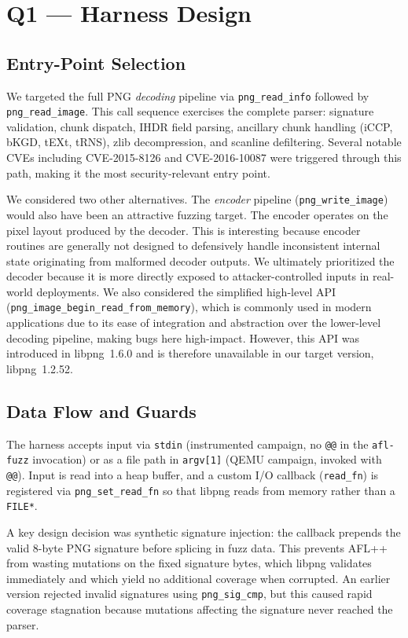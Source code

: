 \documentclass[letterpaper,twocolumn,10pt]{article}
\begin{document}
\section{Q1 --- Harness Design}
\label{sec:q1}

\subsection{Entry-Point Selection}

We targeted the full PNG \emph{decoding} pipeline via
\texttt{png\_read\_info} followed by \texttt{png\_read\_image}.
This call sequence exercises the complete parser: signature
validation, chunk dispatch, IHDR field parsing, ancillary chunk
handling (iCCP, bKGD, tEXt, tRNS), zlib decompression, and scanline
defiltering. Several notable CVEs including CVE-2015-8126 and
CVE-2016-10087 were triggered through this path, making it the most
security-relevant entry point.


We considered two other alternatives. The \emph{encoder} pipeline (\texttt{png\_write\_image}) would also have been an attractive fuzzing target. The encoder operates on the pixel layout produced by the decoder. This is interesting because encoder routines are generally not designed to defensively handle inconsistent internal state originating from malformed decoder outputs. We ultimately prioritized the decoder because it is more directly exposed to attacker-controlled inputs in real-world deployments. We also considered the simplified high-level API (\texttt{png\_image\_begin\_read\_from\_memory}), which is commonly used in modern applications due to its ease of integration and abstraction over the lower-level decoding pipeline, making bugs here high-impact. However, this API was introduced in libpng~1.6.0 and is therefore unavailable in our target version, libpng~1.2.52.

\subsection{Data Flow and Guards}

The harness accepts input via \texttt{stdin} (instrumented campaign,
no \texttt{@@} in the \texttt{afl-fuzz} invocation) or as a file
path in \texttt{argv[1]} (QEMU campaign, invoked with \texttt{@@}).
Input is read into a heap buffer, and a custom I/O callback
(\texttt{read\_fn}) is registered via \texttt{png\_set\_read\_fn}
so that libpng reads from memory rather than a \texttt{FILE*}.

A key design decision was synthetic signature injection: the callback prepends the valid 8-byte PNG signature before splicing in fuzz data. This prevents AFL++ from wasting mutations on the fixed signature bytes, which libpng validates immediately and which yield no additional coverage when corrupted. An earlier version rejected invalid signatures using \texttt{png\_sig\_cmp}, but this caused rapid coverage stagnation because mutations affecting the signature never reached the parser.
\end{document}
